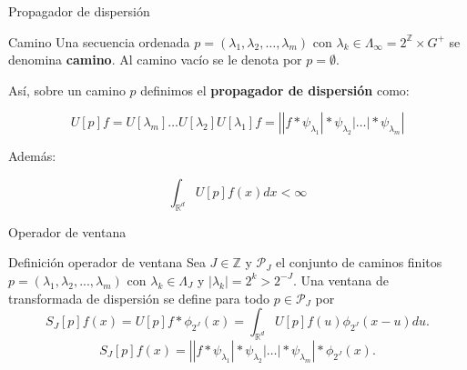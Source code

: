 \documentclass[aspectratio=43]{beamer}
\begin{document}
\begin{frame}{Propagador de dispersión}

  \begin{block}{Camino}
    Una secuencia ordenada $p=(\lambda_1,\lambda_2, \ldots , \lambda_m)$ con $\lambda_k \in \Lambda_\infty=2^{\mathbb{Z}} \times G^{+} $ se denomina \textbf{camino}. Al camino vacío se le denota por $p=\emptyset$.
  \end{block}

  Así, sobre un camino $p$ definimos el \textbf{propagador de dispersión} como:

  $$  U[p]f=U[\lambda_m] \ldots U[\lambda_2]U[\lambda_1]f=\left| |f \ast \psi_{\lambda_1} | \ast \psi_{\lambda_2} | \ldots | \ast \psi_{\lambda_m} \right|
  $$

  \medskip

  Además:

  $$ \int_{\mathbb{R}^d} U[p]f(x)dx < \infty $$
\end{frame}




\begin{frame}{Operador de ventana}
  \begin{block}{Definición operador de ventana}
    Sea $J \in \mathbb{Z}$ y $\mathcal{P}_J$ el conjunto de caminos finitos $p=(\lambda_1,\lambda_2,...,\lambda_m)$ con $\lambda_k \in \Lambda_J$ y $|\lambda_k|=2^{k}>2^{-J}$. Una ventana de transformada de dispersión se define para todo $p \in \mathcal{P}_J$ por
    \begin{equation*}
      S_J[p]f(x)=U[p]f \ast \phi_{2^J}(x)=\int_{\mathbb{R}^d}U[p]f(u)\phi_{2^J}(x-u)du.
    \end{equation*}
    \begin{equation*}
      S_J[p]f(x)=\left| |f \ast \psi_{\lambda_1} | \ast \psi_{\lambda_2} | \ldots | \ast \psi_{\lambda_m} \right| \ast \phi_{2^J}(x).
    \end{equation*}
  \end{block}
\end{frame}
\end{document}

